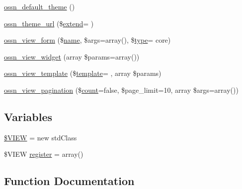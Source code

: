 \begin{DoxyCompactItemize}
\item 
\hyperlink{ossn_8lib_8views_8php_afcd38fcb071f487a12a1462b9390909f}{ossn\+\_\+default\+\_\+theme} ()
\item 
\hyperlink{ossn_8lib_8views_8php_a5b8a8a97086965b69953e900c0315e97}{ossn\+\_\+theme\+\_\+url} (\$\hyperlink{jquery-ui_8min_8js_a087edaba374de09e6e0f0c9a8c157c87}{extend}= \textquotesingle{}\textquotesingle{})
\item 
\hyperlink{ossn_8lib_8views_8php_ac874e6342b6bbe7ac279180d7b4dcd2b}{ossn\+\_\+view\+\_\+form} (\$\hyperlink{user_8php_a765af5e9671743530143a6d3670fd9a6}{name}, \$args=array(), \$\hyperlink{_ossn_wall_2actions_2wall_2post_2group_8php_a2dc1bb4e1ed0029daa81ac0776b14b51}{type}= \textquotesingle{}core\textquotesingle{})
\item 
\hyperlink{ossn_8lib_8views_8php_acc82c84af3b2c5e875013f74a833ae6f}{ossn\+\_\+view\+\_\+widget} (array \$params=array())
\item 
\hyperlink{ossn_8lib_8views_8php_ab3686418a27882f7461dc5ead6f9f69a}{ossn\+\_\+view\+\_\+template} (\$\hyperlink{_chart_8_core_8js_aad213e71e8f7878665e0af623a88a79a}{template}= \textquotesingle{}\textquotesingle{}, array \$params)
\item 
\hyperlink{ossn_8lib_8views_8php_a781fc073a71d40fdf9002a692c8cc553}{ossn\+\_\+view\+\_\+pagination} (\$\hyperlink{photos_2pages_2photos_8php_a364678aa3bd05301b3d1b8650653cf48}{count}=false, \$page\+\_\+limit=10, array \$args=array())
\end{DoxyCompactItemize}
\subsection*{Variables}
\begin{DoxyCompactItemize}
\item 
\hyperlink{ossn_8lib_8views_8php_a51aed5a0c5a65be77b43fc692b66febe}{\$\+V\+I\+EW} = new std\+Class
\item 
\$V\+I\+EW \hyperlink{ossn_8lib_8views_8php_a8f6e4c183faf477ee38054dbc31e85c3}{register} = array()
\end{DoxyCompactItemize}


\subsection{Function Documentation}

